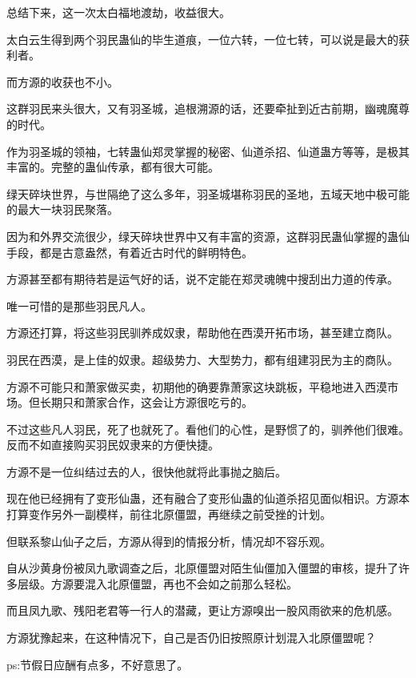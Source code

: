 \begin{this_body}
总结下来，这一次太白福地渡劫，收益很大。

太白云生得到两个羽民蛊仙的毕生道痕，一位六转，一位七转，可以说是最大的获利者。

而方源的收获也不小。

这群羽民来头很大，又有羽圣城，追根溯源的话，还要牵扯到近古前期，幽魂魔尊的时代。

作为羽圣城的领袖，七转蛊仙郑灵掌握的秘密、仙道杀招、仙道蛊方等等，是极其丰富的。完整的蛊仙传承，都有很大可能。

绿天碎块世界，与世隔绝了这么多年，羽圣城堪称羽民的圣地，五域天地中极可能的最大一块羽民聚落。

因为和外界交流很少，绿天碎块世界中又有丰富的资源，这群羽民蛊仙掌握的蛊仙手段，都是古意盎然，有着近古时代的鲜明特色。

方源甚至都有期待若是运气好的话，说不定能在郑灵魂魄中搜刮出力道的传承。

唯一可惜的是那些羽民凡人。

方源还打算，将这些羽民驯养成奴隶，帮助他在西漠开拓市场，甚至建立商队。

羽民在西漠，是上佳的奴隶。超级势力、大型势力，都有组建羽民为主的商队。

方源不可能只和萧家做买卖，初期他的确要靠萧家这块跳板，平稳地进入西漠市场。但长期只和萧家合作，这会让方源很吃亏的。

不过这些凡人羽民，死了也就死了。看他们的心性，是野惯了的，驯养他们很难。反而不如直接购买羽民奴隶来的方便快捷。

方源不是一位纠结过去的人，很快他就将此事抛之脑后。

现在他已经拥有了变形仙蛊，还有融合了变形仙蛊的仙道杀招见面似相识。方源本打算变作另外一副模样，前往北原僵盟，再继续之前受挫的计划。

但联系黎山仙子之后，方源从得到的情报分析，情况却不容乐观。

自从沙黄身份被凤九歌调查之后，北原僵盟对陌生仙僵加入僵盟的审核，提升了许多层级。方源要混入北原僵盟，再也不会如之前那么轻松。

而且凤九歌、残阳老君等一行人的潜藏，更让方源嗅出一股风雨欲来的危机感。

方源犹豫起来，在这种情况下，自己是否仍旧按照原计划混入北原僵盟呢？

ps:节假日应酬有点多，不好意思了。

\end{this_body}

